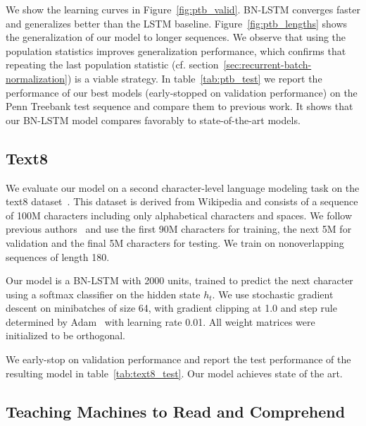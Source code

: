 \documentclass{article} %
\begin{document}
We show the learning curves in Figure~\ref{fig:ptb_valid}.
BN-LSTM converges faster and generalizes better than the LSTM baseline.
Figure~\ref{fig:ptb_lengths} shows the generalization of our model to longer sequences.
We observe that using the population statistics improves generalization performance,
which confirms that repeating the last population statistic (cf. section~\ref{sec:recurrent-batch-normalization})
is a viable strategy.
In table~\ref{tab:ptb_test} we report the performance of our best models (early-stopped on validation performance)
on the Penn Treebank test sequence and compare them to previous work.
It shows that our BN-LSTM model compares favorably to state-of-the-art models.



\subsection{Text8}

We evaluate our model on a second character-level language modeling task on the text8 dataset~\cite{mahoney2009large}.
This dataset is derived from Wikipedia and consists of a sequence of 100M characters including only alphabetical characters and spaces.
We follow previous authors~\cite{mikolov2012subword,zhang2016architectural} and use the first 90M characters for training, the next 5M for validation and the final 5M characters for testing.
We train on nonoverlapping sequences of length 180.

Our model is a BN-LSTM with 2000 units, trained to predict the next character using a softmax classifier on the hidden state $h_t$.
We use stochastic gradient descent on minibatches of size 64,
with gradient clipping at 1.0 and step rule determined by Adam~\cite{kingma2014adam}
with learning rate 0.01.
All weight matrices were initialized to be orthogonal.

We early-stop on validation performance and report the test performance of the resulting model in table~\ref{tab:text8_test}.
Our model achieves state of the art.

\subsection{Teaching Machines to Read and Comprehend}
\end{document}
